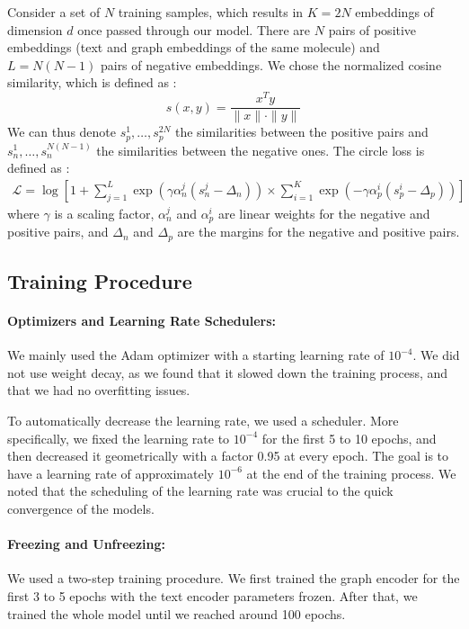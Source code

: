 \documentclass[switch, 11pt]{article}
\begin{document}
\begin{multicols}{2}
    Consider a set of $N$ training samples, which results in $K=2N$ embeddings of dimension $d$ once passed through our model. There are $N$ pairs of positive embeddings (text and graph embeddings of the same molecule) and $L=N(N-1)$ pairs of negative embeddings. We chose the normalized cosine similarity, which is defined as :
    \begin{equation}
        s(x,y)=\frac{x^Ty}{\|x\|\cdot\|y\|}
    \end{equation}
    We can thus denote $s_p^1,\dots,s_p^{2N}$ the similarities between the positive pairs and $s_n^1,\dots,s_n^{N(N-1)}$ the similarities between the negative ones. The circle loss is defined as :
    \begin{gather*}
        \mathcal{L}=\log\left[1+\sum_{j=1}^{L}\exp(\gamma\alpha_{n}^{j}(s_{n}^{j}-\Delta_{n}))\times\sum_{i=1}^{K}\exp(-\gamma\alpha_{p}^{i}(s_{p}^{i}-\Delta_{p}))\right]
    \end{gather*}
    where $\gamma$ is a scaling factor, $\alpha_{n}^{j}$ and $\alpha_{p}^{i}$ are linear weights for the negative and positive pairs, and $\Delta_{n}$ and $\Delta_{p}$ are the margins for the negative and positive pairs.

    \subsection{Training Procedure}
    \paragraph*{Optimizers and Learning Rate Schedulers:} We mainly used the Adam optimizer with a starting learning rate of $10^{-4}$. We did not use weight decay, as we found that it slowed down the training process, and that we had no overfitting issues.

    To automatically decrease the learning rate, we used a scheduler. More specifically, we fixed the learning rate to $10^{-4}$ for the first 5 to 10 epochs, and then decreased it geometrically with a factor 0.95 at every epoch. The goal is to have a learning rate of approximately $10^{-6}$ at the end of the training process. We noted that the scheduling of the learning rate was crucial to the quick convergence of the models.

    \paragraph*{Freezing and Unfreezing:}
    We used a two-step training procedure. We first trained the graph encoder for the first 3 to 5 epochs with the text encoder parameters frozen. After that, we trained the whole model until we reached around 100 epochs.


\end{multicols}
\end{document}
